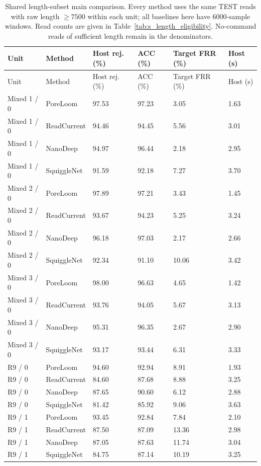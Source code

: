\begin{longtable}{llllll}
\caption{Shared length-subset main comparison. Every method uses the same TEST reads with raw length $\geq7500$ within each unit; all baselines here have 6000-sample windows. Read counts are given in Table~\ref{tab:s_length_eligibility}. No-command reads of sufficient length remain in the denominators.}\label{tab:s_length_main}\\
\toprule
Unit & Method & Host rej. (\%) & ACC (\%) & Target FRR (\%) & Host (s)\\\midrule\endfirsthead
\toprule
Unit & Method & Host rej. (\%) & ACC (\%) & Target FRR (\%) & Host (s)\\\midrule\endhead
\bottomrule\endfoot
Mixed 1 / 0 & PoreLoom & 97.53 & 97.23 & 3.05 & 1.63\\
Mixed 1 / 0 & ReadCurrent & 94.46 & 94.45 & 5.56 & 3.01\\
Mixed 1 / 0 & NanoDeep & 94.97 & 96.44 & 2.18 & 2.95\\
Mixed 1 / 0 & SquiggleNet & 91.59 & 92.18 & 7.27 & 3.70\\
Mixed 2 / 0 & PoreLoom & 97.89 & 97.21 & 3.43 & 1.45\\
Mixed 2 / 0 & ReadCurrent & 93.67 & 94.23 & 5.25 & 3.24\\
Mixed 2 / 0 & NanoDeep & 96.18 & 97.03 & 2.17 & 2.66\\
Mixed 2 / 0 & SquiggleNet & 92.34 & 91.10 & 10.06 & 3.42\\
Mixed 3 / 0 & PoreLoom & 98.00 & 96.63 & 4.65 & 1.42\\
Mixed 3 / 0 & ReadCurrent & 93.76 & 94.05 & 5.67 & 3.13\\
Mixed 3 / 0 & NanoDeep & 95.31 & 96.35 & 2.67 & 2.90\\
Mixed 3 / 0 & SquiggleNet & 93.17 & 93.44 & 6.31 & 3.33\\
R9 / 0 & PoreLoom & 94.60 & 92.94 & 8.91 & 1.93\\
R9 / 0 & ReadCurrent & 84.60 & 87.68 & 8.88 & 3.25\\
R9 / 0 & NanoDeep & 87.65 & 90.60 & 6.12 & 2.88\\
R9 / 0 & SquiggleNet & 81.42 & 85.92 & 9.06 & 3.63\\
R9 / 1 & PoreLoom & 93.45 & 92.84 & 7.84 & 2.10\\
R9 / 1 & ReadCurrent & 87.50 & 87.09 & 13.36 & 2.98\\
R9 / 1 & NanoDeep & 87.05 & 87.63 & 11.74 & 3.04\\
R9 / 1 & SquiggleNet & 84.75 & 87.14 & 10.19 & 3.25\\

\end{longtable}
